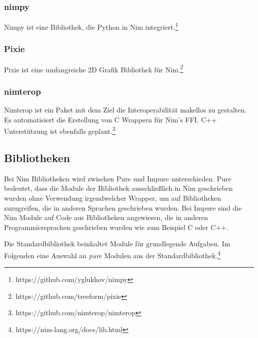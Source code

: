 \documentclass[11pt]{report}
\begin{document}
\subsubsection{nimpy}
Nimpy ist eine Bibliothek, die Python in Nim integriert.\footnote{https://github.com/yglukhov/nimpy}

\subsubsection{Pixie}
Pixie ist eine umfangreiche 2D Grafik Bibliothek für Nim.\footnote{https://github.com/treeform/pixie}

\subsubsection{nimterop}
Nimterop ist ein Paket mit dem Ziel die Interoperabilität makellos zu gestalten. Es automatisiert die Erstellung von C Wrappern für Nim's FFI.
C++ Unterstützung ist ebenfalls geplant.\footnote{https://github.com/nimterop/nimterop}

\subsection{Bibliotheken}
Bei Nim Bibliotheken wird zwischen Pure und Impure unterschieden.
Pure bedeutet, dass die Module der Bibliothek ausschließlich in Nim geschrieben wurden ohne Verwendung irgendwelcher Wrapper, um auf Bibliotheken zuzugreifen, die in anderen Sprachen geschrieben wurden.
Bei Impure sind die Nim Module auf Code aus Bibliotheken angewiesen, die in anderen Programmiersprachen geschrieben wurden wie zum Beispiel C oder C++.

Die Standardbibliothek beinhaltet Module für grundlegende Aufgaben. Im Folgenden eine Auswahl an \emph{pure} Modulen aus der Standardbibliothek.\footnote{https://nim-lang.org/docs/lib.html}
\end{document}

